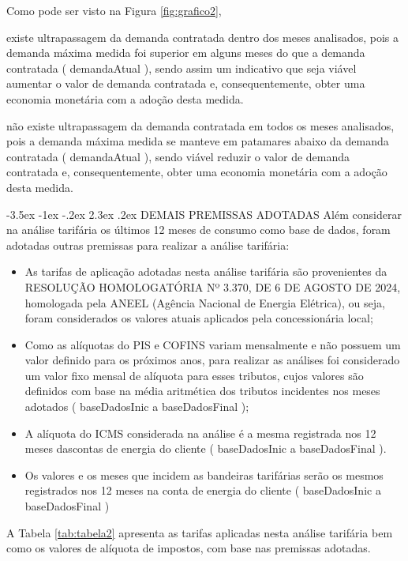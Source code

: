 \documentclass[a4paper,12pt]{abntex2}
\makeatletter
\renewcommand\chapter{\@startsection{chapter}{0}{\z@}%
  {-3.5ex \@plus -1ex \@minus -.2ex}%
  {2.3ex \@plus.2ex}%
  {\normalfont\large\bfseries}}
\makeatother
\begin{document}
Como pode ser visto na Figura \protect\ref{fig:grafico2}, {%
existe ultrapassagem da demanda contratada dentro dos meses analisados, pois a demanda máxima medida foi superior em alguns meses do que a demanda contratada
({{ demandaAtual }}), sendo assim um indicativo que seja viável aumentar o valor de demanda contratada
e, consequentemente, obter uma economia monetária com a adoção desta medida.
{%
não existe ultrapassagem da demanda contratada em todos os meses analisados, pois a demanda máxima medida se manteve em patamares abaixo da demanda contratada ({{ demandaAtual }}), sendo viável reduzir o valor de demanda contratada e, consequentemente, obter uma economia monetária com a adoção desta medida.
{%

\chapter{DEMAIS PREMISSAS ADOTADAS}
Além considerar na análise tarifária os últimos 12 meses de consumo como base de dados, 
foram adotadas outras premissas para realizar a análise tarifária:

\begin{itemize}
    \item As  tarifas  de  aplicação  adotadas  nesta  análise  tarifária  são  provenientes  da RESOLUÇÃO HOMOLOGATÓRIA  Nº 3.370, DE 6 DE AGOSTO DE 2024, homologada pela ANEEL (Agência Nacional de Energia Elétrica), ou seja, foram considerados os valores atuais aplicados pela concessionária local;
    \item Como as alíquotas do PIS e COFINS variam mensalmente e não possuem um valor definido  para os  próximos  anos, para  realizar as  análises  foi  considerado um  valor  fixo mensal de alíquota  para esses tributos, cujos valores são definidos com base na média aritmética dos tributos incidentes nos meses adotados ({{ baseDadosInic }} a {{ baseDadosFinal }});
    \item A alíquota do ICMS considerada na análise é a mesma registrada nos 12 meses dascontas de energia do cliente ({{ baseDadosInic }} a {{ baseDadosFinal }}).
    \item Os  valores  e  os  meses  que  incidem  as  bandeiras  tarifárias  serão  os  mesmos registrados nos 12 meses na conta de energia do cliente ({{ baseDadosInic }} a {{ baseDadosFinal }})
\end{itemize}

A Tabela \ref{tab:tabela2} apresenta as tarifas aplicadas nesta análise tarifária bem como os valores de 
alíquota de impostos, com base nas premissas adotadas.

}}}
\end{document}
